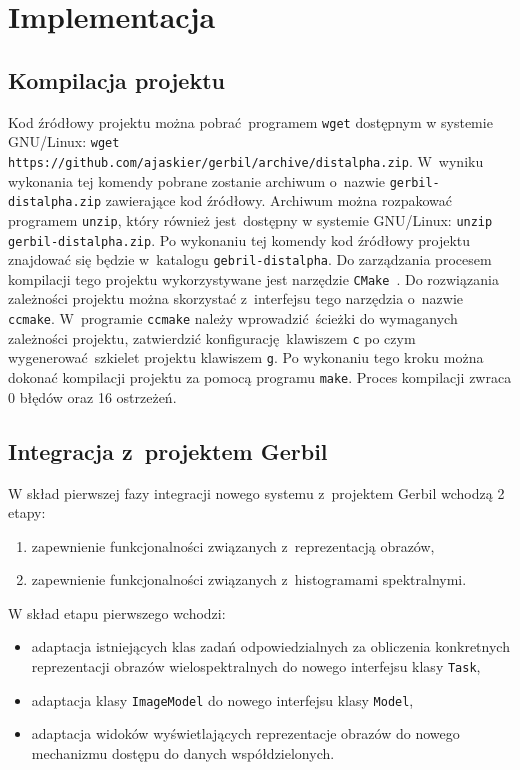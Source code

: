 \chapter{Implementacja}

\section{Kompilacja projektu}
Kod źródłowy projektu można pobrać programem \lstinline$wget$ dostępnym w systemie GNU/Linux: \lstinline$wget https://github.com/ajaskier/gerbil/archive/distalpha.zip$. W~wyniku wykonania tej komendy pobrane zostanie archiwum o~nazwie \lstinline$gerbil-distalpha.zip$ zawierające kod źródłowy. Archiwum można rozpakować programem \lstinline$unzip$, który również jest dostępny w systemie \mbox{GNU/Linux:} \lstinline$unzip gerbil-distalpha.zip$. Po wykonaniu tej komendy kod źródłowy projektu znajdować się będzie w~katalogu \lstinline$gebril-distalpha$. Do zarządzania procesem kompilacji tego projektu wykorzystywane jest narzędzie \lstinline$CMake$~\cite{cmake}. Do rozwiązania zależności projektu można skorzystać z~interfejsu tego narzędzia o~nazwie \lstinline$ccmake$. W~programie \lstinline$ccmake$ należy wprowadzić ścieżki do wymaganych zależności projektu, zatwierdzić konfigurację klawiszem \lstinline$c$ po czym wygenerować szkielet projektu klawiszem \lstinline$g$. Po wykonaniu tego kroku można dokonać kompilacji projektu za pomocą programu \lstinline$make$. Proces kompilacji zwraca 0 błędów oraz 16 ostrzeżeń.

\section{Integracja z~projektem Gerbil}
W skład pierwszej fazy integracji nowego systemu z~projektem Gerbil wchodzą 2 etapy:
\begin{enumerate}[labelwidth=\widthof{\ref{last-item2}},label=\arabic*.]
	\item zapewnienie funkcjonalności związanych z~reprezentacją obrazów,
	\item zapewnienie funkcjonalności związanych z~histogramami spektralnymi.
\end{enumerate}

W skład etapu pierwszego wchodzi: 
\begin{itemize}
		\item adaptacja istniejących klas zadań odpowiedzialnych za obliczenia konkretnych reprezentacji obrazów wielospektralnych do nowego interfejsu klasy \lstinline$Task$,
		\item adaptacja klasy \lstinline$ImageModel$ do nowego interfejsu klasy \lstinline$Model$,
		\item adaptacja widoków wyświetlających reprezentacje obrazów do nowego mechanizmu dostępu do danych współdzielonych.
\end{itemize}

